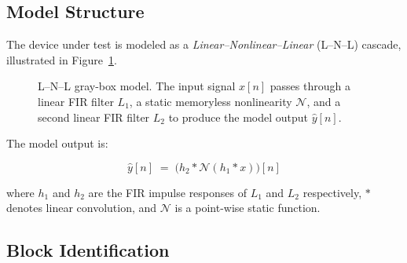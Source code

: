 \documentclass[11pt, letterpaper]{article}
\begin{document}
\subsection{Model Structure}
\label{sec:lnl_structure}

The device under test is modeled as a \emph{Linear--Nonlinear--Linear} (L--N--L)
cascade, illustrated in Figure~\ref{fig:lnl_diagram}.

\begin{figure}[H]
\centering
{}
\caption{L--N--L gray-box model. The input signal $x[n]$ passes through a
linear FIR filter $L_1$, a static memoryless nonlinearity $\mathcal{N}$,
and a second linear FIR filter $L_2$ to produce the model output
$\hat{y}[n]$.}
\label{fig:lnl_diagram}
\end{figure}

The model output is:

\begin{equation}
    \hat{y}[n] \;=\; \bigl(h_2 * \mathcal{N}(h_1 * x)\bigr)[n]
    \label{eq:lnl}
\end{equation}

where $h_1$ and $h_2$ are the FIR impulse responses of $L_1$ and $L_2$
respectively, $*$ denotes linear convolution, and $\mathcal{N}$ is a
point-wise static function.

\subsection{Block Identification}
\label{sec:lnl_id}
\end{document}
